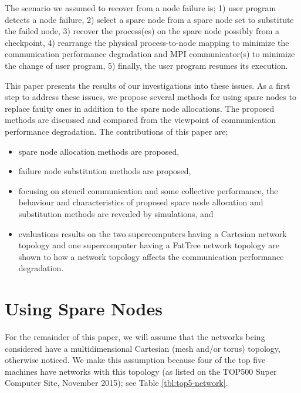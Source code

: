 \documentclass[Afour,times,sagev]{sagej}
\begin{document}
The scenario we assumed to recover from a node failure is;
1) user program detects a node failure, 2) select a spare node from a
spare node set to substitute the failed node, 3) recover the
process(es) on the spare node possibly from a checkpoint, 4)
rearrange the physical process-to-node mapping to minimize the
communication performance degradation and MPI communicator(s) to
minimize the change of user program, 5) finally, the user program
resumes its execution.

This paper presents the results of our investigations into these
issues. As a first step to address these issues, we propose several
methods for using spare nodes to replace faulty ones in addition to
the spare node allocations. The proposed methods are discussed and
compared from the viewpoint of communication performance
degradation. The contributions of this paper are;

\begin{itemize}
\item spare node allocation methods are proposed,
\item failure node substitution methods are proposed,
\item focusing on stencil communication and some collective
  performance, the behaviour and characteristics of proposed spare
  node allocation and substitution methods are revealed by simulations, and
\item evaluations results on the two supercomputers having a Cartesian
  network topology and one supercomputer having a FatTree network
  topology are shown to how a network topology affects the communication
  performance degradation.
\end{itemize}

\section{Using Spare Nodes}

For the remainder of this paper, we will assume that the networks
being considered have a multidimensional Cartesian (mesh and/or torus)
topology, otherwise noticed. We make this assumption because four of
the top five machines have networks with this topology (as listed on
the TOP500 Super Computer Site\citep{top500}, November
2015); see Table \ref{tbl:top5-network}.
\end{document}
